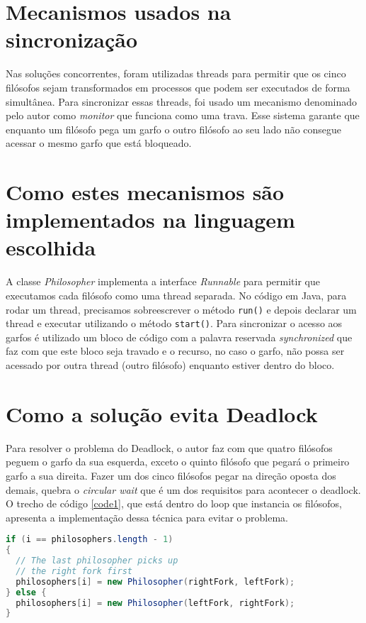 \documentclass[conference]{IEEEtran}
\begin{document}
\section{Mecanismos usados na sincronização}
Nas soluções concorrentes, foram utilizadas threads para permitir que os cinco filósofos sejam transformados em processos que podem ser executados de forma simultânea.
Para sincronizar essas threads, foi usado um mecanismo denominado pelo autor como \textit{monitor}\cite{baeldung_java} que funciona como uma trava.
Esse sistema garante que enquanto um filósofo pega um garfo o outro filósofo ao seu lado não consegue acessar o mesmo garfo que está bloqueado.

\section{Como estes mecanismos são implementados na linguagem escolhida}

A classe \textit{Philosopher} implementa a interface \textit{Runnable} para permitir que executamos cada filósofo como uma thread separada.
No código em Java, para rodar um thread, precisamos sobreescrever o método \verb|run()| e depois declarar um thread e executar utilizando o método \verb|start()|.
Para sincronizar o acesso aos garfos é utilizado um bloco de código com a palavra reservada \textit{synchronized} que faz com que este bloco seja travado e o recurso, no caso o garfo, não possa ser acessado por outra thread (outro filósofo) enquanto estiver dentro do bloco.

\section{Como a solução evita Deadlock}

Para resolver o problema do Deadlock, o autor faz com que quatro filósofos peguem o garfo da sua esquerda, exceto o quinto filósofo que pegará o primeiro garfo a sua direita.
Fazer um dos cinco filósofos pegar na direção oposta dos demais, quebra o \textit{circular wait} que é um dos requisitos para acontecer o deadlock\cite{baeldung_java}.
O trecho de código \ref{code1}, que está dentro do loop que instancia os filósofos, apresenta a implementação dessa técnica para evitar o problema.

\begin{lstlisting}[language=Java, caption=código que previne Deadlock, label=code1]
if (i == philosophers.length - 1)
{
  // The last philosopher picks up
  // the right fork first
  philosophers[i] = new Philosopher(rightFork, leftFork); 
} else {
  philosophers[i] = new Philosopher(leftFork, rightFork);
}
\end{lstlisting}
\end{document}

